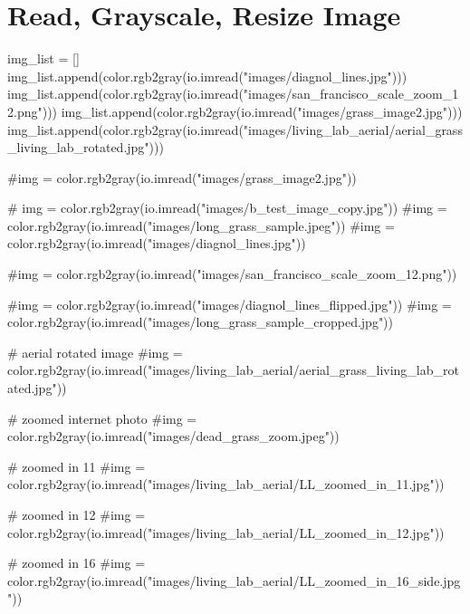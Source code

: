\documentclass[
  letterpaper,
  DIV=11,
  numbers=noendperiod]{scrreprt}
\newenvironment{Shaded}{\begin{snugshade}}{\end{snugshade}}
\newcommand{\CommentTok}[1]{\textcolor[rgb]{0.37,0.37,0.37}{#1}}
\newcommand{\NormalTok}[1]{\textcolor[rgb]{0.00,0.23,0.31}{#1}}
\newcommand{\OperatorTok}[1]{\textcolor[rgb]{0.37,0.37,0.37}{#1}}
\newcommand{\StringTok}[1]{\textcolor[rgb]{0.13,0.47,0.30}{#1}}
\begin{document}
\hypertarget{read-grayscale-resize-image}{%
\section{Read, Grayscale, Resize
Image}\label{read-grayscale-resize-image}}

\begin{Shaded}
\begin{Highlighting}[]
\NormalTok{img\_list }\OperatorTok{=}\NormalTok{ []}
\NormalTok{img\_list.append(color.rgb2gray(io.imread(}\StringTok{"images/diagnol\_lines.jpg"}\NormalTok{)))}
\NormalTok{img\_list.append(color.rgb2gray(io.imread(}\StringTok{"images/san\_francisco\_scale\_zoom\_12.png"}\NormalTok{)))}
\NormalTok{img\_list.append(color.rgb2gray(io.imread(}\StringTok{"images/grass\_image2.jpg"}\NormalTok{)))}
\NormalTok{img\_list.append(color.rgb2gray(io.imread(}\StringTok{"images/living\_lab\_aerial/aerial\_grass\_living\_lab\_rotated.jpg"}\NormalTok{)))}

\CommentTok{\#img = color.rgb2gray(io.imread("images/grass\_image2.jpg"))}

\CommentTok{\# img = color.rgb2gray(io.imread("images/b\_test\_image\_copy.jpg"))}
\CommentTok{\#img = color.rgb2gray(io.imread("images/long\_grass\_sample.jpeg"))}
\CommentTok{\#img = color.rgb2gray(io.imread("images/diagnol\_lines.jpg"))}

\CommentTok{\#img = color.rgb2gray(io.imread("images/san\_francisco\_scale\_zoom\_12.png"))}

\CommentTok{\#img = color.rgb2gray(io.imread("images/diagnol\_lines\_flipped.jpg"))}
\CommentTok{\#img = color.rgb2gray(io.imread("images/long\_grass\_sample\_cropped.jpg"))}

\CommentTok{\# aerial rotated image}
\CommentTok{\#img = color.rgb2gray(io.imread("images/living\_lab\_aerial/aerial\_grass\_living\_lab\_rotated.jpg"))}

\CommentTok{\# zoomed internet photo}
\CommentTok{\#img = color.rgb2gray(io.imread("images/dead\_grass\_zoom.jpeg"))}


\CommentTok{\# zoomed in 11}
\CommentTok{\#img = color.rgb2gray(io.imread("images/living\_lab\_aerial/LL\_zoomed\_in\_11.jpg"))}

\CommentTok{\# zoomed in 12}
\CommentTok{\#img = color.rgb2gray(io.imread("images/living\_lab\_aerial/LL\_zoomed\_in\_12.jpg"))}

\CommentTok{\# zoomed in 16}
\CommentTok{\#img = color.rgb2gray(io.imread("images/living\_lab\_aerial/LL\_zoomed\_in\_16\_side.jpg"))}




\end{Highlighting}
\end{Shaded}
\end{document}
